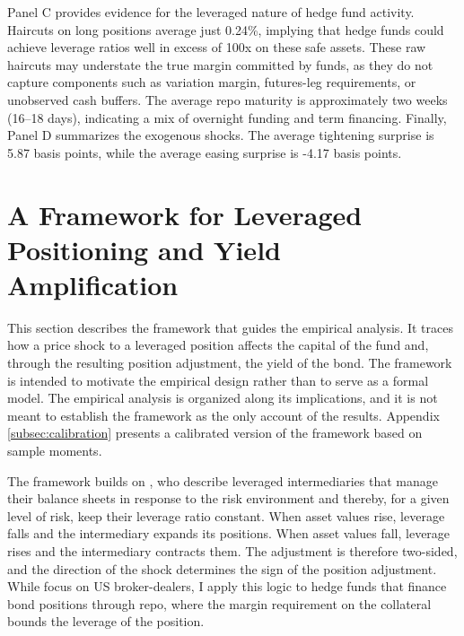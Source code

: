 \documentclass[english, 11pt, oneside]{article}
\begin{document}
Panel C provides evidence for the leveraged nature of hedge fund activity. Haircuts on long positions average just 0.24\%, implying that hedge funds could achieve leverage ratios well in excess of 100x on these safe assets. These raw haircuts may understate the true margin committed by funds, as they do not capture components such as variation margin, futures-leg requirements, or unobserved cash buffers. The average repo maturity is approximately two weeks (16–18 days), indicating a mix of overnight funding and term financing. Finally, Panel D summarizes the exogenous shocks. The average tightening surprise is 5.87 basis points, while the average easing surprise is -4.17 basis points.







\section{A Framework for Leveraged Positioning and Yield Amplification}
\label{sec:mechanism}

This section describes the framework that guides the empirical analysis. It traces how a price shock to a leveraged position affects the capital of the fund and, through the resulting position adjustment, the yield of the bond. The framework is intended to motivate the empirical design rather than to serve as a formal model. The empirical analysis is organized along its implications, and it is not meant to establish the framework as the only account of the results. Appendix \ref{subsec:calibration} presents a calibrated version of the framework based on sample moments.

The framework builds on \citet{adrian2014}, who describe leveraged intermediaries that manage their balance sheets in response to the risk environment and thereby, for a given level of risk, keep their leverage ratio constant. When asset values rise, leverage falls and the intermediary expands its positions. When asset values fall, leverage rises and the intermediary contracts them. The adjustment is therefore two-sided, and the direction of the shock determines the sign of the position adjustment. While \citet{adrian2014} focus on US broker-dealers, I apply this logic to hedge funds that finance bond positions through repo, where the margin requirement on the collateral bounds the leverage of the position.
\end{document}
